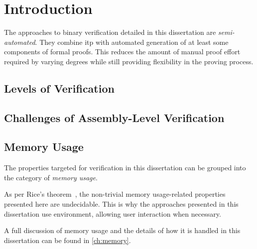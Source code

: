 \chapter{Introduction}
The approaches to binary verification detailed in this dissertation
are \emph{semi-automated}.
They combine \ac{itp} with automated generation
of at least some components of formal proofs.
This reduces the amount of manual proof effort required by varying degrees
while still providing flexibility in the proving process.


\section{Levels of Verification}  
\section{Challenges of Assembly-Level Verification}
\section{Memory Usage}
The properties targeted for verification in this dissertation
can be grouped into the category of \emph{memory usage}.


As per Rice's theorem~\citep{rice1953classes},
the non-trivial memory usage-related properties presented here are undecidable.
This is why the approaches presented in this dissertation
use  environment, allowing user interaction when necessary.

A full discussion of memory usage and the details of how it is handled in this dissertation
can be found in \cref{ch:memory}.
